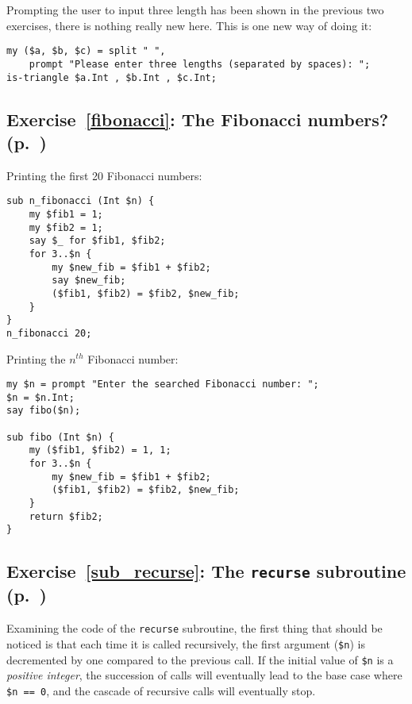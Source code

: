 Prompting the user to input three length has been shown in 
the previous two exercises, there is nothing really new here.
This is one new way of doing it:

\begin{verbatim}
my ($a, $b, $c) = split " ", 
    prompt "Please enter three lengths (separated by spaces): ";
is-triangle $a.Int , $b.Int , $c.Int;
\end{verbatim}


\subsection{Exercise~\ref{fibonacci}: The Fibonacci numbers? (p.~\pageref{fibonacci})}
\label{sol_fibonacci}

Printing the first 20 Fibonacci numbers:

\begin{verbatim}
sub n_fibonacci (Int $n) {
    my $fib1 = 1;
    my $fib2 = 1;
    say $_ for $fib1, $fib2;
    for 3..$n {
        my $new_fib = $fib1 + $fib2;
        say $new_fib;
        ($fib1, $fib2) = $fib2, $new_fib;
    }
}
n_fibonacci 20;
\end{verbatim}

Printing the $n^{th}$ Fibonacci number:

\begin{verbatim}
my $n = prompt "Enter the searched Fibonacci number: ";
$n = $n.Int;
say fibo($n);

sub fibo (Int $n) {
    my ($fib1, $fib2) = 1, 1;
    for 3..$n {
        my $new_fib = $fib1 + $fib2;
        ($fib1, $fib2) = $fib2, $new_fib;
    }
    return $fib2;
}    
\end{verbatim}

\subsection{Exercise~\ref{sub_recurse}: The {\tt recurse} subroutine (p.~\pageref{sub_recurse})}
\label{sol_sub_recurse}

Examining the code of the {\tt recurse} subroutine, the 
first thing that should be noticed is that each time it 
is called recursively, the first argument (\verb'$n') is 
decremented by one compared to the previous call. If the 
initial value of \verb'$n' is a \emph{positive integer}, the 
succession of calls will eventually lead to the base case 
where \verb'$n == 0', and the cascade of recursive calls 
will eventually stop. 

